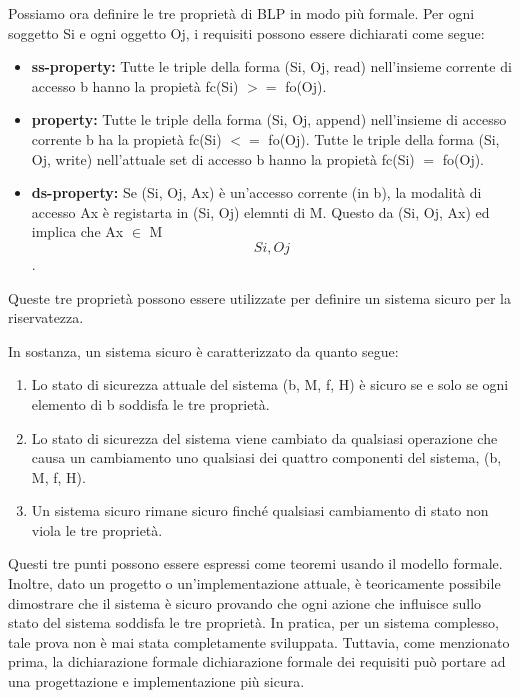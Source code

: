 \newpage
Possiamo ora definire le tre proprietà di BLP in modo più formale. Per ogni soggetto Si e ogni oggetto Oj, i requisiti possono essere dichiarati come segue:

\begin{itemize}
    \item \textbf{ss-property:} Tutte le triple della forma (Si, Oj, read) nell'insieme corrente di accesso b hanno la propietà fc(Si) $>=$ fo(Oj).
    
    \item \textbf{property:} Tutte le triple della forma (Si, Oj, append) nell'insieme di accesso corrente b ha la propietà fc(Si) $<=$ fo(Oj). Tutte le triple della forma (Si, Oj, write) nell'attuale set di accesso b hanno la propietà fc(Si) $=$ fo(Oj).
    
    \item \textbf{ds-property:} Se (Si, Oj, Ax) è un'accesso corrente (in b), la modalità di accesso Ax è registarta in (Si, Oj) elemnti di M. Questo da (Si, Oj, Ax) ed implica che Ax $\in$ M\[Si, Oj\].

\end{itemize}
Queste tre proprietà possono essere utilizzate per definire un sistema sicuro per la riservatezza.

\singlespacing

In sostanza, un sistema sicuro è caratterizzato da quanto segue:
\begin{enumerate}
    \item Lo stato di sicurezza attuale del sistema (b, M, f, H) è sicuro se e solo se ogni elemento di b soddisfa le tre proprietà.
    
    \item Lo stato di sicurezza del sistema viene cambiato da qualsiasi operazione che causa un cambiamento uno qualsiasi dei quattro componenti del sistema, (b, M, f, H).
    
    \item Un sistema sicuro rimane sicuro finché qualsiasi cambiamento di stato non viola le tre proprietà.
\end{enumerate}
Questi tre punti possono essere espressi come teoremi usando il modello formale. Inoltre, dato un progetto o un'implementazione attuale, è teoricamente possibile dimostrare che il sistema è sicuro provando che ogni azione che influisce sullo stato del sistema soddisfa le tre proprietà. In pratica, per un sistema complesso, tale prova non è mai stata completamente sviluppata. Tuttavia, come menzionato prima, la dichiarazione formale dichiarazione formale dei requisiti può portare ad una progettazione e implementazione più sicura.
\newpage
